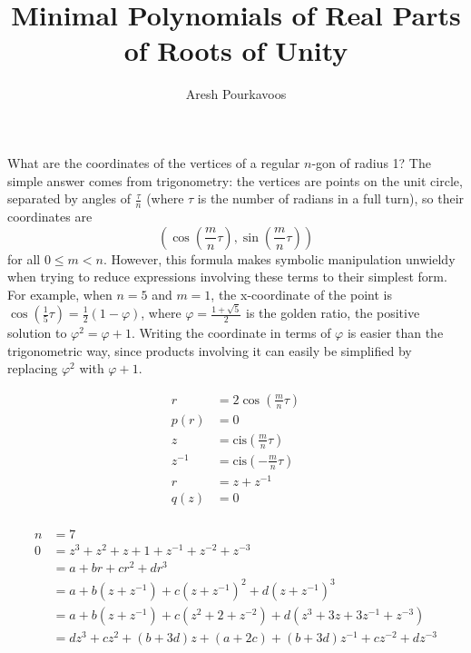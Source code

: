 \documentclass{article}
\begin{document}
\title{Minimal Polynomials of Real Parts of Roots of Unity}
\author{Aresh Pourkavoos}
\maketitle

\newcommand{\cis}{\text{cis}}

What are the coordinates of the vertices
of a regular $n$-gon of radius 1?
The simple answer comes from trigonometry:
the vertices are points on the unit circle,
separated by angles of $\frac{\tau}{n}$
(where $\tau$ is the number of radians in a full turn),
so their coordinates are
\[\left(\cos\left(\frac{m}{n}\tau\right), \sin\left(\frac{m}{n}\tau\right)\right)\]
for all $0 \leq m < n$.
However, this formula makes symbolic manipulation unwieldy
when trying to reduce expressions involving these terms to their simplest form.
For example, when $n=5$ and $m=1$,
the x-coordinate of the point is
$\cos\left(\frac{1}{5}\tau\right) = \frac{1}{2}(1-\varphi)$,
where $\varphi = \frac{1+\sqrt{5}}{2}$ is the golden ratio,
the positive solution to $\varphi^2 = \varphi+1$.
Writing the coordinate in terms of $\varphi$ is easier than the trigonometric way,
since products involving it can easily be simplified
by replacing $\varphi^2$ with $\varphi+1$.

\begin{align*}
  r &= 2\cos\left(\frac{m}{n}\tau\right) \\
  p(r) &= 0 \\ 
  z &= \cis\left(\frac{m}{n}\tau\right) \\
  z^{-1} &= \cis\left(-\frac{m}{n}\tau\right) \\
  r &= z+z^{-1} \\
  q(z) &= 0 \\
\end{align*}

\begin{align*}
  n &= 7 \\
  0 &= z^3+z^2+z+1+z^{-1}+z^{-2}+z^{-3} \\
  &= a+br+cr^2+dr^3 \\
  &= a+b(z+z^{-1})+c(z+z^{-1})^2+d(z+z^{-1})^3 \\
  &= a+b(z+z^{-1})+c(z^2+2+z^{-2})+d(z^3+3z+3z^{-1}+z^{-3}) \\
  &= dz^3+cz^2+(b+3d)z+(a+2c)+(b+3d)z^{-1}+cz^{-2}+dz^{-3}
\end{align*}
\end{document}
